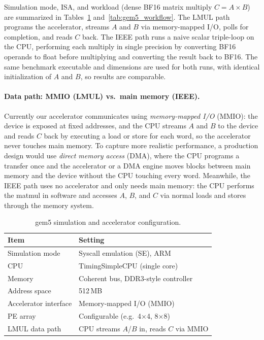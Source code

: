 \documentclass[12pt,letterpaper]{article}
\begin{document}
Simulation mode, ISA, and workload (dense BF16 matrix multiply $C = A \times B$) are summarized in Tables~\ref{tab:gem5_config} and~\ref{tab:gem5_workflow}. The LMUL path programs the accelerator, streams $A$ and $B$ via memory-mapped I/O, polls for completion, and reads $C$ back. The IEEE path runs a naive scalar triple-loop on the CPU, performing each multiply in single precision by converting BF16 operands to float before multiplying and converting the result back to BF16. The same benchmark executable and dimensions are used for both runs, with identical initialization of $A$ and $B$, so results are comparable.

\paragraph{Data path: MMIO (LMUL) vs.\ main memory (IEEE).}
Currently our accelerator communicates using \emph{memory-mapped I/O} (MMIO): the device is exposed at fixed addresses, and the CPU streams $A$ and $B$ to the device and reads $C$ back by executing a load or store for each word, so the accelerator never touches main memory. To capture more realistic performance, a production design would use \emph{direct memory access} (DMA), where the CPU programs a transfer once and the accelerator or a DMA engine moves blocks between main memory and the device without the CPU touching every word. Meanwhile, the IEEE path uses no accelerator and only needs main memory: the CPU performs the matmul in software and accesses $A$, $B$, and $C$ via normal loads and stores through the memory system.

\begin{table}[H]
\centering
\caption{gem5 simulation and accelerator configuration.}
\label{tab:gem5_config}
\begin{tabular}{@{}ll@{}}
\toprule
\textbf{Item} & \textbf{Setting} \\
\midrule
Simulation mode & Syscall emulation (SE), ARM \\
CPU & TimingSimpleCPU (single core) \\
Memory & Coherent bus, DDR3-style controller \\
Address space & 512\,MB \\
Accelerator interface & Memory-mapped I/O (MMIO) \\
PE array & Configurable (e.g.\ 4$\times$4, 8$\times$8) \\
LMUL data path & CPU streams $A$/$B$ in, reads $C$ via MMIO \\
\bottomrule
\end{tabular}
\end{table}
\end{document}
